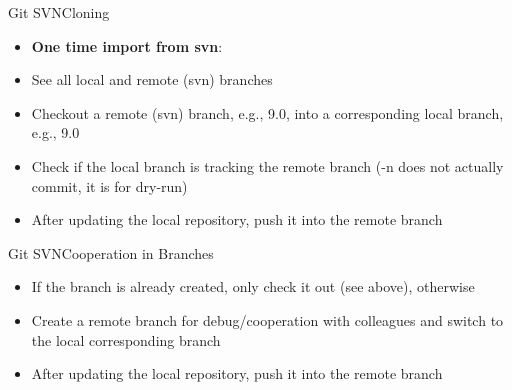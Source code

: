 \begin{frame}{Git SVN}{Cloning}
  \begin{itemize}
    \item \textbf{One time import from svn}:
    \item See all local and remote (svn) branches
    \item  Checkout a remote (svn) branch, e.g., 9.0, into a corresponding local branch, e.g., 9.0
  \item Check if the local branch is tracking the remote branch
   (-n does not actually commit, it is for dry-run)
  \item After updating the local repository, push it into the remote branch
  \end{itemize}
\end{frame}

\begin{frame}{Git SVN}{Cooperation in Branches}
  \begin{itemize}
    \item If the branch is already created, only check it out (see above), otherwise
    \item Create a remote branch for debug/cooperation with colleagues and switch to the local corresponding branch
  \item After updating the local repository, push it into the remote branch
  \end{itemize}
\end{frame}

